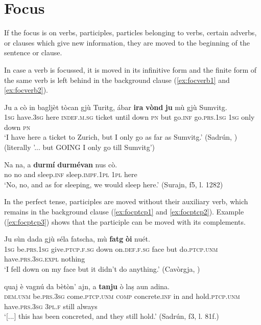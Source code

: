 \section{Focus}
If the focus is on verbs, participles, particles belonging to verbs, certain adverbs, or clauses which give new information, they are moved to the beginning of the sentence or clause.

In case a verb is focussed, it is moved in its infinitive form and the finite form of the same verb is left behind in the background clause (\ref{ex:focverb1} and \ref{ex:focverb2}).


\ea
\label{ex:focverb1}
\gll  Ju a cò in bagljèt tòcan gjù Turitg, ábar \textbf{ira} \textbf{vònd} \textbf{ju} mù gjù Sumvitg.\\
\textsc{1sg} have.\textsc{3sg} here \textsc{indef.m.sg} ticket until down \textsc{pn} but go.\textsc{inf} go.\textsc{prs}.\textsc{1sg} \textsc{1sg} only down \textsc{pn}\\
\glt `I have here a ticket to Zurich, but I only go as far as Sumvitg.' (Sadrún, \citealt[106]{Büchli1966}) (literally '... but GOING I only go till Sumvitg')
\z

\ea
\label{ex:focverb2}
\gll Na na, a \textbf{durmí} \textbf{durmévan} nus cò.\\
no no and sleep.\textsc{inf} sleep.\textsc{impf.1pl} \textsc{1pl} here \\
\glt `No, no, and as for sleeping, we would sleep here.' (Surajn, f5, l. 1282)
\z

In the perfect tense, participles are moved without their auxiliary verb, which remains in the background clause (\ref{ex:focptcp1} and \ref{ex:focptcp2}). Example (\ref{ex:focptcp3}) shows that the participle can be moved with its complements.

\ea
\label{ex:focptcp1}
\gll Ju sùn dada gjù séla fatscha, mù \textbf{fatg} \textbf{òi} nuét.\\
\textsc{1sg} be.\textsc{prs.1sg} give.\textsc{ptcp.f.sg} down on.\textsc{def.f.sg} face but do.\textsc{ptcp.unm} have.\textsc{prs.3sg.expl} nothing\\
\glt `I fell down on my face but it didn't do anything.' (Cavòrgja, \citealt[106]{Büchli1966})
\z

\ea
\label{ex:focptcp2}
\gll  [...] quaj è vagnú da bètòn’ ajn, a \textbf{tanju} ò laṣ aun adina. \\
{} \textsc{dem.unm} be.\textsc{prs.3sg} come.\textsc{ptcp.unm} \textsc{comp} concrete.\textsc{inf} in and hold.\textsc{ptcp.unm} have.\textsc{prs.3sg} \textsc{3pl.f} still always \\
\glt `[...] this has been concreted, and they still hold.' (Sadrún, f3, l. 81f.)
\z

